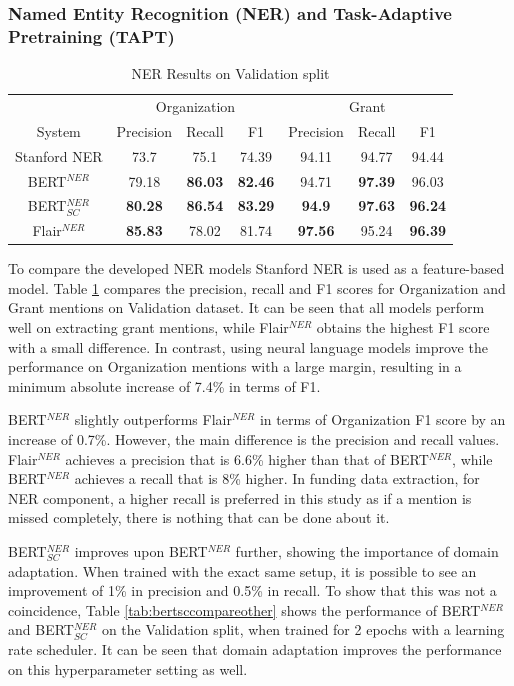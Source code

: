 \documentclass{report}
\theoremstyle{definition}
\theoremstyle{remark}
\begin{document}
\subsubsection{Named Entity Recognition (NER) and Task-Adaptive Pretraining (TAPT)}


\begin{table}
    \centering
    \begin{tabular}{c| c c c| c c c}
    &\multicolumn{3}{c|}{Organization}&\multicolumn{3}{c}{Grant} \\
    System&Precision&Recall&F1&Precision&Recall&F1\\
    \hline
    Stanford NER & 73.7&	75.1&74.39&94.11&94.77&94.44
 \\[0.7ex]
    BERT$^{NER}$ & 79.18&\textbf{86.03}&\textbf{82.46}&94.71&\textbf{97.39}&96.03
\\[0.7ex]
    BERT$^{NER}_{SC}$ & \textbf{80.28}&\textbf{86.54}&\textbf{83.29}&\textbf{94.9}	&\textbf{97.63}&\textbf{96.24}
  \\[0.7ex]
    Flair$^{NER}$& \textbf{85.83}&78.02&81.74&\textbf{97.56}&95.24&\textbf{96.39}
 \\[0.7ex]
    \end{tabular}
    \caption{NER Results on Validation split}
    \label{tab:all_ner_results}
\end{table}

To compare the developed NER models Stanford NER \cite{stanfordNER} is used as a feature-based model. Table \ref{tab:all_ner_results} compares the precision, recall and F1 scores for Organization and Grant mentions on Validation dataset. It can be seen that all models perform well on extracting grant mentions, while Flair$^{NER}$ obtains the highest F1 score with a small difference. In contrast, using neural language models improve the performance on Organization mentions with a large margin, resulting in a minimum absolute increase of 7.4\% in terms of F1.

BERT$^{NER}$ slightly outperforms Flair$^{NER}$ in terms of Organization F1 score by an increase of 0.7\%. However, the main difference is the precision and recall values. Flair$^{NER}$ achieves a precision that is 6.6\% higher than that of BERT$^{NER}$, while BERT$^{NER}$ achieves a recall that is 8\% higher. In funding data extraction, for NER component, a higher recall is preferred in this study as if a mention is missed completely, there is nothing that can be done about it.

BERT$^{NER}_{SC}$ improves upon BERT$^{NER}$ further, showing the importance of domain adaptation. When trained with the exact same setup, it is possible to see an improvement of 1\% in precision and 0.5\% in recall. To show that this was not a coincidence, Table \ref{tab:bertsccompareother} shows the performance of BERT$^{NER}$ and BERT$^{NER}_{SC}$ on the Validation split, when trained for 2 epochs with a learning rate scheduler. It can be seen that domain adaptation improves the performance on this hyperparameter setting as well.
\end{document}
